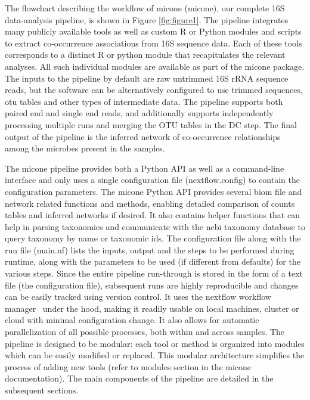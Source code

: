   \vspace{-5mm}
  The flowchart describing the workflow of \ac{micone} (\acl{micone}), our complete 16S data-analysis pipeline, is shown in Figure \ref{fig:figure1}.
  The pipeline integrates many publicly available tools as well as custom R or Python modules and scripts to extract co-occurrence associations from 16S sequence data.
  Each of these tools corresponds to a distinct R or python module that recapitulates the relevant analyses.
  All such individual modules are available as part of the \ac{micone} package.
  The inputs to the pipeline by default are raw untrimmed 16S rRNA sequence reads, but the software can be alternatively configured to use trimmed sequences, \ac{otu} tables and other types of intermediate data.
  The pipeline supports both paired end and single end reads, and additionally supports independently processing multiple runs and merging the OTU tables in the DC step.
  The final output of the pipeline is the inferred network of co-occurrence relationships among the microbes present in the samples.

  The \ac{micone} pipeline provides both a Python API as well as a command-line interface and only uses a single configuration file (nextflow.config) to contain the configuration parameters.
  The \ac{micone} Python API provides several biom file and network related functions and methods, enabling detailed comparison of counts tables and inferred networks if desired.
  It also contains helper functions that can help in parsing taxonomies and communicate with the \ac{ncbi} taxonomy database to query taxonomy by name or taxonomic ids.
  The configuration file along with the run file (main.nf) lists the inputs, output and the steps to be performed during runtime, along with the parameters to be used (if different from defaults) for the various steps.
  Since the entire pipeline run-through is stored in the form of a text file (the configuration file), subsequent runs are highly reproducible and changes can be easily tracked using version control.
  It uses the nextflow workflow manager~\cite{Tommaso2015} under the hood, making it readily usable on local machines, cluster or cloud with minimal configuration change.
  It also allows for automatic parallelization of all possible processes, both within and across samples.
  The pipeline is designed to be modular: each tool or method is organized into modules which can be easily modified or replaced.
  This modular architecture simplifies the process of adding new tools (refer to modules section in the \ac{micone} documentation).
  The main components of the pipeline are detailed in the subsequent sections.

